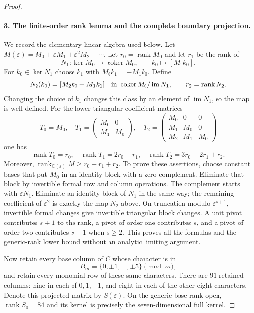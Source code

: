 \begin{proof}
\paragraph{3. The finite-order rank lemma and the complete boundary projection.}
We record the elementary linear algebra used below. Let
$M(\varepsilon)=M_0+\varepsilon M_1+\varepsilon^2M_2+\cdots$.
Let $r_0=\operatorname{rank}M_0$ and let $r_1$ be the rank of
\[
 N_1:\ker M_0\longrightarrow\operatorname{coker}M_0,
 \qquad k_0\longmapsto[M_1k_0].
\]
For $k_0\in\ker N_1$ choose $k_1$ with
$M_0k_1=-M_1k_0$. Define
\[
 N_2(k_0)=[M_2k_0+M_1k_1]
 \quad\hbox{in }\operatorname{coker}M_0/\operatorname{im}N_1,
 \qquad r_2=\operatorname{rank}N_2.
\]
Changing the choice of $k_1$ changes this class by an element
of $\operatorname{im}N_1$, so the map is well defined.
For the lower triangular coefficient matrices
\begin{equation}\label{R27:Toeplitz}
 T_0=M_0,\quad
 T_1=\begin{pmatrix}M_0&0\\M_1&M_0\end{pmatrix},\quad
 T_2=\begin{pmatrix}M_0&0&0\\M_1&M_0&0\\M_2&M_1&M_0\end{pmatrix}
\end{equation}
one has
\begin{equation}\label{R27:jet_ranks}
 \operatorname{rank}T_0=r_0,\quad
 \operatorname{rank}T_1=2r_0+r_1,\quad
 \operatorname{rank}T_2=3r_0+2r_1+r_2.
\end{equation}
Moreover, $\operatorname{rank}_{\mathbb C(\varepsilon)}M
\geq r_0+r_1+r_2$. To prove these assertions, choose constant
bases that put $M_0$ in an identity block with a zero complement.
Eliminate that block by invertible formal row and column
operations. The complement starts with $\varepsilon N_1$.
Eliminate an identity block of $N_1$ in the same way; the
remaining coefficient of $\varepsilon^2$ is exactly the map
$N_2$ above. On truncation modulo $\varepsilon^{s+1}$,
invertible formal changes give invertible triangular block
changes. A unit pivot contributes $s+1$ to the rank, a pivot
of order one contributes $s$, and a pivot of order two contributes
$s-1$ when $s\geq2$. This proves all the formulas and the
generic-rank lower bound without an analytic limiting argument.

Now retain every base column of $C$ whose character is in
\[
 B_m=\{0,\pm1,\ldots,\pm5\}\pmod m,
\]
and retain every monomial row of these same characters. There
are $91$ retained columns: nine in each of $0,1,-1$, and eight
in each of the other eight characters. Denote this projected
matrix by $S(\varepsilon)$. On the generic base-rank open,
$\operatorname{rank}S_0=84$ and its kernel is precisely the
seven-dimensional full kernel.


\end{proof}
